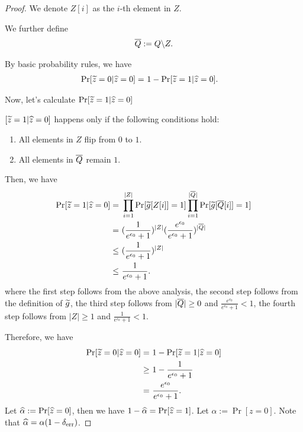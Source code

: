 \begin{proof}
We denote $Z[i]$ as the $i$-th element in $Z$. 

We further define
\begin{align*}
    \overline{Q} := Q \backslash Z.
\end{align*}


By basic probability rules, we have
\begin{align*}
    \Pr[\widetilde{z} = 0 | \widehat{z} = 0] = & ~ 1 - \Pr[\widetilde{z} = 1 | \widehat{z} = 0].
\end{align*}

Now, let's calculate $\Pr[\widetilde{z} = 1 | \widehat{z} = 0]$

$[\widetilde{z} = 1 | \widehat{z} = 0]$ happens only if the following conditions hold:
\begin{enumerate}
    \item All elements in $Z$ flip from $0$ to $1$.
    \item All elements in $\overline{Q}$ remain $1$.
\end{enumerate}

Then, we have
\begin{align*}
    \Pr[\widetilde{z} = 1 | \widehat{z} = 0]  = & ~ \prod_{i = 1}^{|Z|} \Pr [\widetilde{g}[Z[i]] = 1] \prod_{i = 1}^{|\overline{Q}|} \Pr [\widetilde{g}[\overline{Q}[i]] = 1] \notag \\
    = & ~ (\frac{1}{e^{\epsilon_0} + 1})^{|Z|} (\frac{e^{\epsilon_0}}{e^{\epsilon_0} + 1})^{|\overline{Q}|} \notag \\
    \leq & ~ (\frac{1}{e^{\epsilon_0} + 1})^{|Z|} \notag \\
    \leq & ~ \frac{1}{e^{\epsilon_0} + 1}.
\end{align*}
where the first step follows from the above analysis, the second step follows from the definition of $\widetilde{g}$, the third step follows from $|\overline{Q}| \geq 0$ and $\frac{e^{\epsilon_0}}{e^{\epsilon_0} + 1} < 1$, the fourth step follows from $|Z| \geq 1$ and $\frac{1}{e^{\epsilon_0} + 1} < 1$. 

Therefore, we have
\begin{align}\label{eq:pr_wtz0_z0}
    \Pr[\widetilde{z} = 0 | \widehat{z} = 0] = & ~ 1 - \Pr[\widetilde{z} = 1 | \widehat{z} = 0] \notag \\
    \geq & ~ 1 -  \frac{1}{e^{\epsilon_0} + 1} \notag \\
    = & ~ \frac{ e^{\epsilon_0} }{ e^{\epsilon_0} + 1 }.
\end{align}
Let $\widehat \alpha := \Pr[ \widehat{z} = 0 ]$, then we have $1- \widehat{\alpha} = \Pr[ \widehat{z} = 1 ]$. 
Let $\alpha := \Pr[ z = 0 ]$.
Note that $ \widehat{\alpha} = \alpha (1 - \delta_{\mathrm{err}}) $.


\end{proof}
